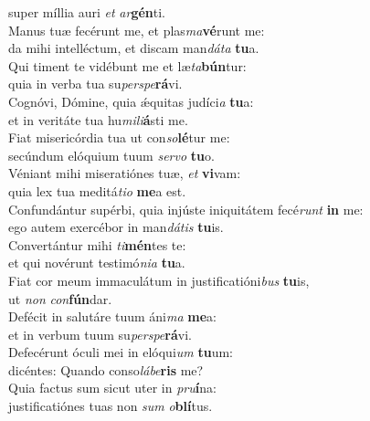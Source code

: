 \evenverse super míllia auri \textit{et} \textit{ar}\textbf{gén}ti.\\
\oddverse Manus tuæ fecérunt me, et plas\textit{ma}\textbf{vé}runt me:~\*\\
\oddverse da mihi intelléctum, et discam man\textit{dá}\textit{ta} \textbf{tu}a.\\
\evenverse Qui timent te vidébunt me et læ\textit{ta}\textbf{bún}tur:~\*\\
\evenverse quia in verba tua su\textit{per}\textit{spe}\textbf{rá}vi.\\
\oddverse Cognóvi, Dómine, quia ǽquitas judíci\textit{a} \textbf{tu}a:~\*\\
\oddverse et in veritáte tua hu\textit{mi}\textit{li}\textbf{á}sti me.\\
\evenverse Fiat misericórdia tua ut con\textit{so}\textbf{lé}tur me:~\*\\
\evenverse secúndum elóquium tuum \textit{ser}\textit{vo} \textbf{tu}o.\\
\oddverse Véniant mihi miseratiónes tuæ, \textit{et} \textbf{vi}vam:~\*\\
\oddverse quia lex tua meditá\textit{ti}\textit{o} \textbf{me}a est.\\
\evenverse Confundántur supérbi, quia injúste iniquitátem fecé\textit{runt} \textbf{in} me:~\*\\
\evenverse ego autem exercébor in man\textit{dá}\textit{tis} \textbf{tu}is.\\
\oddverse Convertántur mihi \textit{ti}\textbf{mén}tes te:~\*\\
\oddverse et qui novérunt testimó\textit{ni}\textit{a} \textbf{tu}a.\\
\evenverse Fiat cor meum immaculátum in justificatióni\textit{bus} \textbf{tu}is,~\*\\
\evenverse ut \textit{non} \textit{con}\textbf{fún}dar.\\
\oddverse Defécit in salutáre tuum áni\textit{ma} \textbf{me}a:~\*\\
\oddverse et in verbum tuum su\textit{per}\textit{spe}\textbf{rá}vi.\\
\evenverse Defecérunt óculi mei in elóqui\textit{um} \textbf{tu}um:~\*\\
\evenverse dicéntes: Quando conso\textit{lá}\textit{be}\textbf{ris} me?\\
\oddverse Quia factus sum sicut uter in \textit{pru}\textbf{í}na:~\*\\
\oddverse justificatiónes tuas non \textit{sum} \textit{o}\textbf{blí}tus.\\
